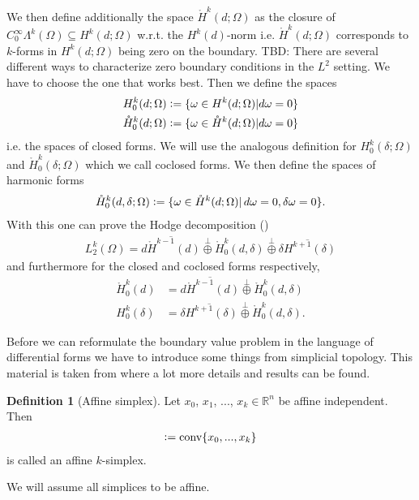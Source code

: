\documentclass[12pt,a4paper]{article}
\theoremstyle{definition}
\newtheorem{definition}{Definition}
\newcommand{\real}{\mathbb{R}}
\begin{document}
We then define 
additionally the space $\mathring{H}^k(d;\Omega)$ as the closure of 
$C_0^\infty \Lambda^k(\Omega) \subseteq H^k(d;\Omega)$ w.r.t. 
the $H^k(d)$-norm i.e. 
$\mathring{H}^k(d;\Omega)$ corresponds to $k$-forms in $H^k(d;\Omega)$
being zero on the boundary. {\color{red} TBD: There are several different 
ways to characterize zero boundary conditions in the $L^2$ setting. We have
to choose the one that works best.} %
Then we define the spaces 
\begin{align*}
    H^k_0(d;\Omega) &\vcentcolon= \{ \omega \in H^k(d;\Omega) 
    | d\omega = 0 \} \\
    \mathring{H}^k_0(d;\Omega) &\vcentcolon= \{ \omega \in \mathring{H}^k(d;\Omega) 
    | d\omega = 0 \}
\end{align*}
i.e. the spaces of closed forms. We will use the analogous definition for 
$H^k_0(\delta;\Omega)$ and $\mathring{H}^k_0(\delta;\Omega)$ which we call 
coclosed forms. We then define the spaces of harmonic forms
\begin{align*}
    \mathring{H}^k_0(d,\delta;\Omega) \vcentcolon= 
    \{ \omega \in \mathring{H}^k(d;\Omega) 
    | \, d\omega = 0, \delta\omega = 0 \}.
\end{align*}
With this one can prove the Hodge decomposition (\cite[Lemma 1]{arnold})
\begin{align}
    L_2^k(\Omega) = \overline{d\mathring{H}^{k-1}(d)} \stackrel{\perp}{\oplus} 
    \mathring{H}^k_0(d,\delta) \stackrel{\perp}{\oplus} 
    \overline{\delta H^{k+1}(\delta)} \label{hodge_decomposition}
\end{align}
and furthermore for the closed and coclosed forms respectively,
\begin{align}
    \mathring{H}^k_0(d) &= \overline{d\mathring{H}^{k-1}(d)} 
    \stackrel{\perp}{\oplus}
    \mathring{H}^k_0(d,\delta) \label{decomposition_closed_forms} \\
    H^k_0(\delta) &= \overline{\delta H^{k+1}(\delta)} \stackrel{\perp}{\oplus}
    \mathring{H}^k_0(d,\delta). \label{decomposition_coclosed_forms}
\end{align}


Before we can reformulate the boundary value problem in the language of 
differential forms we have to 
introduce some things from simplicial topology. This material is taken from
\cite{topology_and_geometry} where a lot more details and results can be found.

\begin{definition}[Affine simplex]
    Let $x_0$, $x_1$, ..., $x_k \in \real^n$ be affine independent. Then 
    \begin{align*}
    [x_0,x_1,...,x_k] \vcentcolon= \text{conv}\{x_0,...,x_k\}
    \end{align*}
    is called an affine $k$-simplex.
\end{definition}
\noindent We will assume all simplices to be affine.
\end{document}
